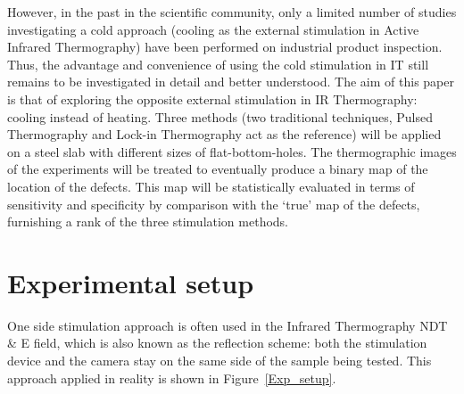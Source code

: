 \documentclass[]{spie}  %
\begin{document}
However, in the past in the scientific community, only a limited number of studies investigating a cold approach (cooling as the external stimulation in Active Infrared Thermography) have been performed on industrial product inspection\cite{endohdynamical2012,2012-LewisHom,Lei2016detection}. Thus, the advantage and convenience of using the cold stimulation in IT still remains to be investigated in detail and better understood. The aim of this paper is that of exploring the opposite external stimulation in IR Thermography: cooling instead of heating. Three methods (two traditional techniques, Pulsed Thermography and Lock-in Thermography act as the reference) will be applied on a steel slab with different sizes of flat-bottom-holes. The thermographic images of the experiments will be  treated to  eventually produce a binary map of the location of the defects. This map will be statistically evaluated in terms of sensitivity and specificity\cite{Fawcett2006} by comparison with the `true’ map of the defects, furnishing a rank of the three stimulation methods. 



\section{Experimental setup} %
\label{sec:experimental_setup}
One side stimulation approach is often used in the Infrared Thermography NDT \& E field, which is also known as the reflection scheme: both the stimulation device and the camera stay on the same side of the sample being tested. This approach applied in reality is shown in Figure~\ref{Exp_setup}.
\end{document}
